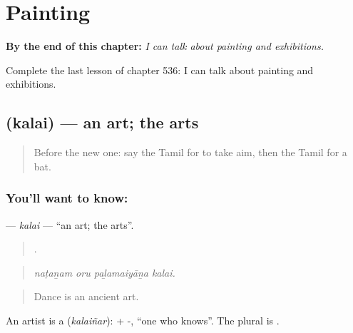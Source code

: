 
\chapter{Painting}
\label{ch:ta-painting}

\begin{chapteropening}
\textbf{By the end of this chapter:} \emph{I can talk about painting and exhibitions.}

Complete the last lesson of chapter 536: I can talk about painting and exhibitions.
\end{chapteropening}

\section[\texorpdfstring{\ta{கலை} (kalai)}{கலை (kalai)}]{ (kalai) — an art; the arts}

\label{lesson:TA-C536-kalai-art}



\begin{quote}
Before the new one: say the Tamil for to take aim, then the Tamil for a bat.
\end{quote}

\subsection*{You'll want to know: }
\textbf{} — \emph{kalai} — \textquotedblleft{}an art; the arts\textquotedblright{}.

\begin{quote}
   .
\end{quote}

\begin{quote}
\emph{naṭaṉam oru paḻamaiyāṉa kalai.}
\end{quote}

\begin{quote}
Dance is an ancient art.
\end{quote}

An artist is a  (\emph{kalaiñar}):  + -, \textquotedblleft{}one who knows\textquotedblright{}. The plural is .

